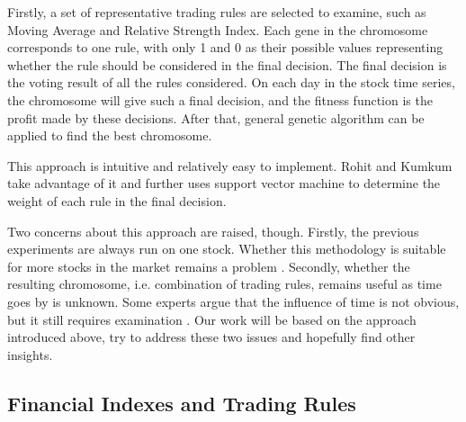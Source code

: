 \documentclass{article}
\begin{document}
Firstly, a set of representative trading rules are selected to examine,
such as Moving Average and Relative Strength Index.
Each gene in the chromosome corresponds to one rule,
with only 1 and 0 as their possible values
representing whether the rule should be considered in the final decision.
The final decision is the voting result of all the rules considered.
On each day in the stock time series, the chromosome will give such a final decision,
and the fitness function is the profit made by these decisions.
After that, general genetic algorithm can be applied to find the best chromosome.

This approach is intuitive and relatively easy to implement.
Rohit and Kumkum \cite{a-hybrid-machine-learning-system-for-stock-market-forecasting}
take advantage of it and further uses support vector machine
to determine the weight of each rule in the final decision.

Two concerns about this approach are raised, though.
Firstly, the previous experiments are always run on one stock.
Whether this methodology is suitable for more stocks in the market remains a problem
\cite{genetic-algorithms-for-predicting-the-egyptian-stock-market}.
Secondly, whether the resulting chromosome, i.e. combination of trading rules,
remains useful as time goes by is unknown.
Some experts argue that the influence of time is not obvious,
but it still requires examination
\cite{stock-timing-using-genetic-algorithms}.
Our work will be based on the approach introduced above,
try to address these two issues and hopefully find other insights.


\subsection{Financial Indexes and Trading Rules}







\end{document}
